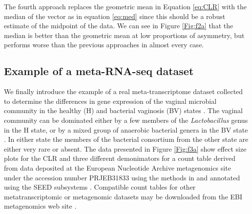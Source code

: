 \documentclass[graybox]{svmult}
\begin{document}
The fourth approach replaces the geometric mean in Equation \ref{eq:CLR} with the  median of the vector as in equation \ref{eq:med} since this should be a robust estimate of the midpoint of the data. We can see in Figure \ref{Fig:f2a} that the median is better than the geometric mean at low proportions of asymmetry, but performs worse than the previous approaches in almost every case.

\subsection*{Example of a meta-RNA-seq dataset}
\label{subsec:2.3}


 We finally introduce the example of a real meta-transcriptome dataset collected to determine the differences in gene expression of the vaginal microbial community in the healthy (H) and bacterial vaginosis (BV) states \cite{macklaim:2013,Denge00262-18}. The vaginal community can be dominated either by a few members of the \textit{Lactobacillus} genus in the H state, or by a mixed group of anaerobic bacterial genera in the BV state \cite{Ravel:2010}. In either state the members of the bacterial consortium from the other state are either very rare or absent. The data presented in Figure \ref{Fig:f3a} show effect size plots for the CLR and three different demonimators for a count table  derived from data deposited at the European Nucleotide Archive metagenomics site under the accession number PRJEB31833 using  the  methods in \cite{Macklaim:2018aa} and annotated using the SEED subsystems \cite{Overbeek:2014aa}. Compatible count tables for other metatranscriptomic or metagenomic datasets may be downloaded from the EBI metagenomics web site \cite{Mitchell:2018aa}.
\end{document}
